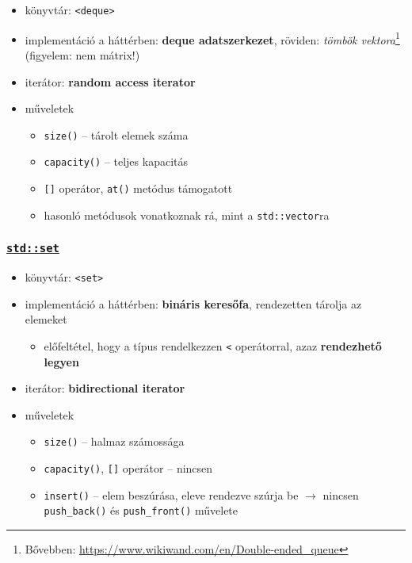 \documentclass[a4paper, 11pt, oneside]{book}
\begin{document}
\begin{itemize}
	\item könyvtár: \verb*|<deque>|
	\item implementáció a háttérben: \textbf{deque adatszerkezet}, röviden: \textit{tömbök vektora}\footnote{Bővebben: \url{https://www.wikiwand.com/en/Double-ended_queue}} \\ (figyelem: nem mátrix!)
	\item iterátor: \textbf{random access iterator}
	\item műveletek
	\begin{itemize}
		\item \texttt{size()} -- tárolt elemek száma
		\item \texttt{capacity()} -- teljes kapacitás
		\item \texttt{[]} operátor, \verb*|at()| metódus támogatott
		\item hasonló metódusok vonatkoznak rá, mint a \verb*|std::vector|ra
	\end{itemize}
\end{itemize}

\subsubsection{\underline{\texttt{std::set}}}

\begin{itemize}
	\item könyvtár: \verb*|<set>|
	\item implementáció a háttérben: \textbf{bináris keresőfa}, rendezetten tárolja az elemeket
	\begin{itemize}
		\item előfeltétel, hogy a típus rendelkezzen \verb*|<| operátorral, azaz \textbf{rendezhető legyen}
	\end{itemize}
	\item iterátor: \textbf{bidirectional iterator}
	\item műveletek
	\begin{itemize}
		\item \texttt{size()} -- halmaz számossága
		\item \texttt{capacity()}, \texttt{[]} operátor -- nincsen
		\item \verb*|insert()| -- elem beszúrása, eleve rendezve szúrja be $\to$ nincsen \verb*|push_back()| és \verb*|push_front()| művelete
	\end{itemize}
\end{itemize}
\end{document}
